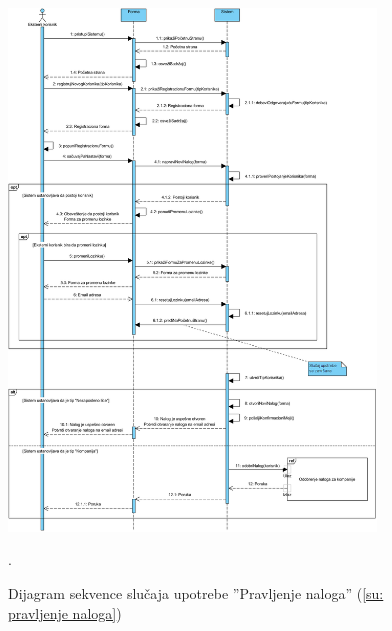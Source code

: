 \begin{figure}[H]
	\centering
	\includegraphics[width=0.87\textwidth]{dijagrami/dijagrami-sekvence/pravljenje-naloga.png}
	\caption{Dijagram sekvence slu\v caja upotrebe ''Pravljenje naloga'' (\ref{su: pravljenje naloga})}.
\end{figure}